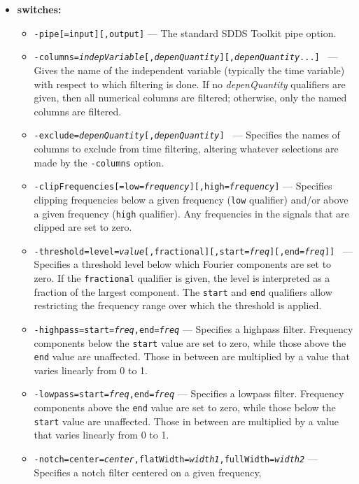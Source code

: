 \begin{itemize}
\item {\bf switches:} 
    \begin{itemize} 
    \item {\tt -pipe[=input][,output]} --- The standard SDDS Toolkit pipe option. 
    \item {\tt -columns={\em indepVariable}[,{\em depenQuantity}][,{\em depenQuantity}...] } ---  
    Gives the name of the independent variable (typically the time variable) 
    with respect to which filtering is done.  If no {\em depenQuantity} 
    qualifiers are given, then all numerical columns are filtered; 
    otherwise, only the named columns are filtered. 
   \item {\tt -exclude={\em depenQuantity}[,{\em depenQuantity}] } --- 
   Specifies the names of columns to exclude from time filtering, 
   altering whatever selections are made by the {\tt -columns} 
   option. 
    \item {\tt -clipFrequencies[=low={\em frequency}][,high={\em frequency}]} 
    --- Specifies clipping frequencies below a given frequency ({\tt low}  
    qualifier) and/or above a given frequency ({\tt high} qualifier). 
    Any frequencies in the signals that are clipped are set to zero. 
    \item {\tt -threshold=level={\em value}[,fractional][,start={\em freq}][,end={\em freq}]] }  
    --- Specifies a threshold level below which Fourier components are 
    set to zero.  If the {\tt fractional} qualifier is given, the level 
    is interpreted as a fraction of the largest component. 
    The {\tt start} and {\tt end} qualifiers allow restricting the  
    frequency range over which the threshold is applied. 
    \item {\tt -highpass=start={\em freq},end={\em freq}} --- 
    Specifies a highpass filter.  Frequency components below the {\tt start} 
    value are set to zero, while those above the {\tt end} value are 
    unaffected.  Those in between are multiplied by a value that varies 
    linearly from 0 to 1. 
    \item {\tt -lowpass=start={\em freq},end={\em freq}} --- 
    Specifies a lowpass filter.  Frequency components above the {\tt end} 
    value are set to zero, while those below the {\tt start} value are 
    unaffected.  Those in between are multiplied by a value that varies 
    linearly from 0 to 1. 
    \item {\tt -notch=center={\em center},flatWidth={\em width1},fullWidth={\em width2}} 
    --- Specifies a notch filter centered on a given frequency,  

\end{itemize}
\end{itemize}
